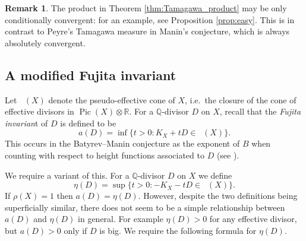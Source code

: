 \documentclass[a4paper,12pt,reqno]{amsart}
\numberwithin{equation}{section} \numberwithin{figure}{section}
\DeclareMathOperator{\Pic}{Pic} \DeclareMathOperator{\Div}{Div}
\DeclareMathOperator{\Eff}{\Lambda_{eff} }
\newcommand\Q{\mathbb{Q}}
\newcommand\R{\mathbb{R}}
\newcommand\C{\mathbb{C}}
\renewcommand{\leq}{\leqslant}
\renewcommand{\#}{\sharp}
\newcommand{\fp}{\mathfrak{p}}
\newtheorem{lemma}{Lemma}
\theoremstyle{definition}
\newtheorem{remark}[lemma]{Remark}
\numberwithin{lemma}{section}
\begin{document}

\begin{remark}
	The product in Theorem \ref{thm:Tamagawa_product} may be only
	conditionally convergent: for an example, see Proposition \ref{prop:easy}. 
	This is in contrast to Peyre's Tamagawa measure in Manin's conjecture, 
	which is always absolutely convergent.	
\end{remark}

\subsection{A modified Fujita invariant}
Let $\Eff(X)$ denote the pseudo-effective cone of $X$, i.e.~the closure of the cone of effective divisors in $\Pic(X) \otimes \R$.
For a $\Q$-divisor $D$ on $X$, recall that the \textit{Fujita invarian}t of $D$ is defined to be
$$a(D) = \inf\{t > 0 : K_X + tD \in \Eff(X) \}.$$
This occurs in the Batyrev--Manin conjecture as the exponent of $B$ when counting with respect to height functions associated to $D$ (see \cite[Conj.~3.2]{BM90}).


We require a variant of this. For a $\Q$-divisor $D$ on $X$ we define
\begin{equation} \label{def:modified_Fujita}
	\eta(D) =  \sup\{t > 0 : -K_X - tD \in \Eff(X) \}.
\end{equation}
If $\rho(X) = 1$ then $a(D) = \eta(D)$. However, despite the two definitions being superficially similar, there does not seem to be a simple relationship between $a(D)$ and $\eta(D)$ in general. For example $\eta(D)> 0$ for any effective divisor, but $a(D) > 0$ only if $D$ is big. We require the following formula for $\eta(D)$.
\end{document}
